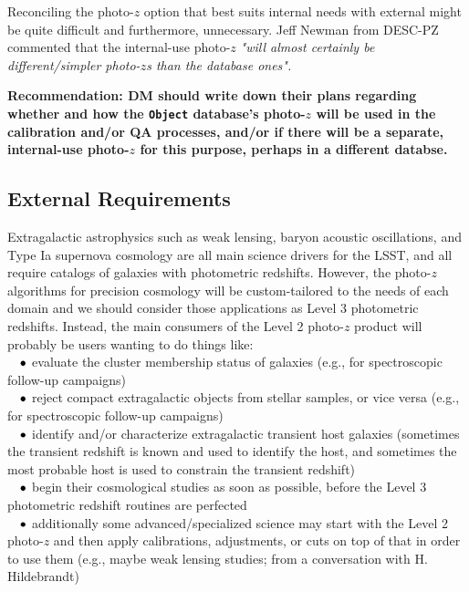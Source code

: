 \documentclass[DM,lsstdraft,toc]{lsstdoc}
\begin{document}
Reconciling the photo-$z$ option that best suits internal needs with external might be quite difficult and furthermore, unnecessary. Jeff Newman from DESC-PZ commented that the internal-use photo-$z$ {\it "will almost certainly be different/simpler photo-$z$s than the database ones".}

\textbf{Recommendation: DM should write down their plans regarding whether and how the {\tt Object} database's photo-$z$ will be used in the calibration and/or QA processes, and/or if there will be a separate, internal-use photo-$z$ for this purpose, perhaps in a different databse.}

\subsection{External Requirements}\label{ssec:motivation_external}

Extragalactic astrophysics such as weak lensing, baryon acoustic oscillations, and Type Ia supernova cosmology are all main science drivers for the LSST, and all require catalogs of galaxies with photometric redshifts. However, the photo-$z$ algorithms for precision cosmology will be custom-tailored to the needs of each domain and we should consider those applications as Level 3 photometric redshifts. Instead, the main consumers of the Level 2 photo-$z$ product will probably be users wanting to do things like: \\
${\rm \ \ \ }\bullet$ evaluate the cluster membership status of galaxies (e.g., for spectroscopic follow-up campaigns)\\
${\rm \ \ \ }\bullet$ reject compact extragalactic objects from stellar samples, or vice versa (e.g., for spectroscopic follow-up campaigns) \\
${\rm \ \ \ }\bullet$ identify and/or characterize extragalactic transient host galaxies (sometimes the transient redshift is known and used to identify the host, and sometimes the most probable host is used to constrain the transient redshift) \\
${\rm \ \ \ }\bullet$ begin their cosmological studies as soon as possible, before the Level 3 photometric redshift routines are perfected \\
${\rm \ \ \ }\bullet$ additionally some advanced/specialized science may start with the Level 2 photo-$z$ and then apply calibrations, adjustments, or cuts on top of that in order to use them (e.g., maybe weak lensing studies; from a conversation with H. Hildebrandt)
\end{document}
